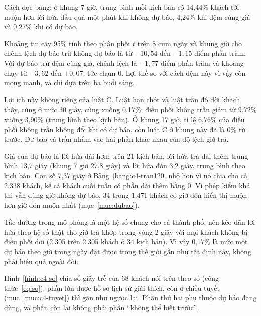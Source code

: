 Cách đọc bảng: ở khung 7 giờ, trung bình mỗi kịch bản có 14,44\% khách tới muộn hơn lời hứa đầu quá một phút khi
không dự báo, 4,24\% khi đệm cùng giá và 0,27\% khi có dự báo.

Khoảng tin cậy 95\% tính theo phân phối $t$ trên 8 cụm ngày và khung giờ cho chênh lệch dự báo trừ không dự báo là
từ $-10{,}54$ đến $-1{,}15$ điểm phần trăm. Với dự báo trừ đệm cùng giá, chênh lệch là $-1{,}77$ điểm phần trăm và
khoảng chạy từ $-3{,}62$ đến $+0{,}07$, tức chạm 0. Lợi thế so với cách đệm này vì vậy còn mong manh, và chỉ dựa trên
ba buổi sáng.

Lợi ích này không riêng của luật C. Luật hạn chót và luật trần độ dời khách thấy, cùng ở mức 30 giây, cũng xuống
0,17\%; điều phối không trần giảm từ 9,72\% xuống 3,90\% (trung bình theo kịch bản). Ở khung 17 giờ, tỉ lệ 6,76\% của
điều phối không trần không đổi khi có dự báo, còn luật C ở khung này đã là 0\% từ trước. Dự báo và trần nhắm vào hai
phần khác nhau của độ lệch giờ trả.

Giá của dự báo là lời hứa dài hơn: trên 21 kịch bản, lời hứa trả dài thêm trung bình 13,7 giây (khung 7 giờ 27,8
giây) và lời hứa đón 3,2 giây, trung bình theo kịch bản. Con số 7,37 giây ở Bảng~\ref{bang:c4-tran120} nhỏ hơn vì nó
chia cho cả 2.338 khách, kể cả khách cuối tuần có phần dài thêm bằng 0. Vì phép kiểm khả thi vẫn dùng giờ không dự
báo, 34 trong 1.471 khách có giờ đón hiển thị muộn hơn giờ đón muộn nhất (mục~\ref{muc:dubao}).

Tắc đường trong mô phỏng là một hệ số chung cho cả thành phố, nên kéo dãn lời hứa theo hệ số thật cho giờ trả khớp
trong vòng 2 giây với mọi khách không bị điều phối dời (2.305 trên 2.305 khách ở 34 kịch bản). Vì vậy 0,17\% là mức
một dự báo theo giờ trong ngày đạt được trong thế giới gần như tất định này, không phải hiệu quả ngoài đời.

Hình~\ref{hinh:c4-so} chia số giây trễ của 68 khách nói trên theo sổ (công thức~\eqref{eq:so}): phần lớn được hồ sơ
lịch sử giải thích, còn ở chiều tuyết (mục~\ref{muc:c4-tuyet}) thì gần như ngược lại. Phần thứ hai phụ thuộc dự báo
đang dùng, và phần còn lại không phải phần ``không thể biết trước''.

